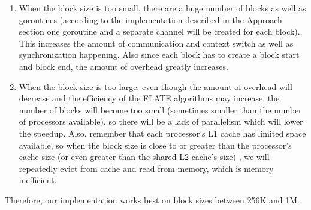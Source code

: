 \documentclass[12pt]{article}
\begin{document}
    \begin{enumerate}
        \item When the block size is too small, there are a huge number of blocks as well as goroutines (according to the implementation described in the Approach section one goroutine and a separate channel will be created for each block). This increases the amount of communication and context switch as well as synchronization happening. Also since each block has to create a block start and block end, the amount of overhead greatly increases.
        \item When the block size is too large, even though the amount of overhead will decrease and the efficiency of the FLATE algorithms may increase, the number of blocks will become too small (sometimes smaller than the number of processors available), so there will be a lack of parallelism which will lower the speedup. Also, remember that each processor's L1 cache has limited space available, so when the block size is close to or greater than the processor's cache size (or even greater than the shared L2 cache's size) , we will repeatedly evict from cache and read from memory, which is memory inefficient.
    \end{enumerate}
    Therefore, our implementation works best on block sizes between 256K and 1M.
\end{document}
